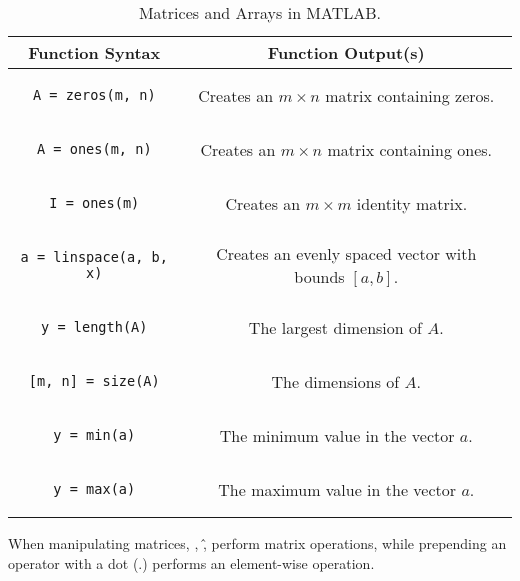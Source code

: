 \documentclass{article}
\begin{document}
\begin{table}[H]
    \centering
    \begin{tabular}{c | c}
        \toprule
        Function Syntax & Function Output(s) \\
        \midrule
        \begin{lstlisting}
A = zeros(m, n)
        \end{lstlisting} & Creates an $m \times n$ matrix containing zeros. \\
        \begin{lstlisting}
A = ones(m, n)
        \end{lstlisting} & Creates an $m \times n$ matrix containing ones. \\
        \begin{lstlisting}
I = ones(m)
        \end{lstlisting} & Creates an $m \times m$ identity matrix. \\
        \begin{lstlisting} 
a = linspace(a, b, x)
        \end{lstlisting} & Creates an evenly spaced vector with bounds $\left[a, b\right]$. \\
        \begin{lstlisting}
y = length(A)
        \end{lstlisting} & The largest dimension of $A$. \\
        \begin{lstlisting}
[m, n] = size(A)
        \end{lstlisting} & The dimensions of $A$. \\
        \begin{lstlisting}
y = min(a)
        \end{lstlisting} & The minimum value in the vector $a$. \\
        \begin{lstlisting}
y = max(a)
        \end{lstlisting} & The maximum value in the vector $a$. \\
        \bottomrule
    \end{tabular}
    \caption{Matrices and Arrays in MATLAB.}
\end{table}
When manipulating matrices, \ast, \^, perform matrix operations, while prepending an operator with a dot (.) performs an element-wise operation.
\end{document}
